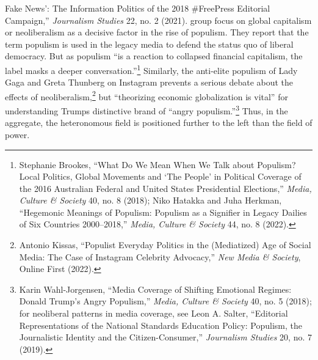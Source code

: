 \documentclass{tufte-handout}
\begin{document}
{{{  Fake News': The Information Politics of the 2018 \#FreePress Editorial
  Campaign,'' \emph{Journalism Studies} 22, no. 2 (2021).}  group focus on global
capitalism or neoliberalism as a decisive factor in the rise of
populism. They report that the term populism is used in the legacy media
to defend the status quo of liberal democracy. But as populism ``is a
reaction to collapsed financial capitalism, the label masks a deeper
conversation.''\footnote{Stephanie Brookes, ``What Do We Mean When We
  Talk about Populism? Local Politics, Global Movements and `The People'
  in Political Coverage of the 2016 Australian Federal and United States
  Presidential Elections,'' \emph{Media, Culture \& Society} 40, no. 8
  (2018); Niko Hatakka and Juha Herkman, ``Hegemonic Meanings of
  Populism: Populism as a Signifier in Legacy Dailies of Six Countries
  2000--2018,'' \emph{Media, Culture \& Society} 44, no. 8 (2022).}
Similarly, the anti-elite populism of Lady Gaga and Greta Thunberg on
Instagram prevents a serious debate about the effects of
neoliberalism,\footnote{Antonio Kissas, ``Populist Everyday Politics in
  the (Mediatized) Age of Social Media: The Case of Instagram Celebrity
  Advocacy,'' \emph{New Media \& Society}, Online First (2022).} but
``theorizing economic globalization is vital'' for understanding
Trump\textquotesingle s distinctive brand of ``angry
populism.''\footnote{Karin Wahl-Jorgensen, ``Media Coverage of Shifting
  Emotional Regimes: Donald Trump's Angry Populism,'' \emph{Media,
  Culture \& Society} 40, no. 5 (2018); for neoliberal patterns in media
  coverage, see Leon A. Salter, ``Editorial Representations of the
  National Standards Education Policy: Populism, the Journalistic
  Identity and the Citizen-Consumer,'' \emph{Journalism Studies} 20, no.
  7 (2019).} Thus, in the aggregate, the heteronomous field is
positioned further to the left than the field of power.

}}
\end{document}
